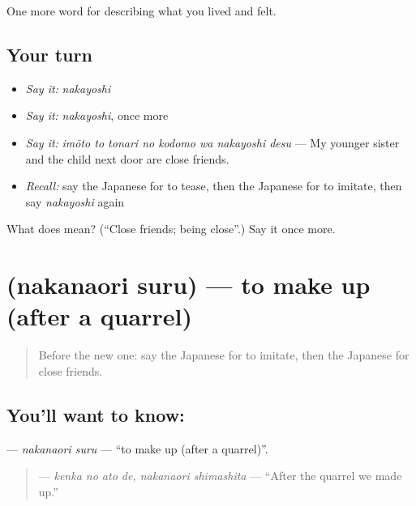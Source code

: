 \begin{grammarlens}[title={What you've built}]
One more word for describing what you lived and felt.
\end{grammarlens}

\subsection*{Your turn}
\begin{itemize}
\raggedright
  \item \emph{Say it:} \emph{nakayoshi}
  \item \emph{Say it:} \emph{nakayoshi}, once more
  \item \emph{Say it:} \emph{imōto to tonari no kodomo wa nakayoshi desu} — My younger sister and the child next door are close friends.
  \item \emph{Recall:} say the Japanese for to tease, then the Japanese for to imitate, then say \emph{nakayoshi} again
\end{itemize}

\begin{tcolorbox}[breakable,colback=teal!4,colframe=teal!35!black,title={Before you move on}]
What does  mean? (\textquotedblleft{}Close friends; being close\textquotedblright{}.) Say it once more.
\end{tcolorbox}
\section[\texorpdfstring{\ja{なかなおりする} (nakanaori suru)}{なかなおりする (nakanaori suru)}]{ (nakanaori suru) — to make up (after a quarrel)}

\label{lesson:JA-C479-nakanaori-suru}



\begin{quote}
Before the new one: say the Japanese for to imitate, then the Japanese for close friends.
\end{quote}

\subsection*{You'll want to know: }
\textbf{} — \emph{nakanaori suru} — \textquotedblleft{}to make up (after a quarrel)\textquotedblright{}.

\begin{quote}
\textbf{ } — \emph{kenka no ato de, nakanaori shimashita} — \textquotedblleft{}After the quarrel we made up.\textquotedblright{}
\end{quote}

